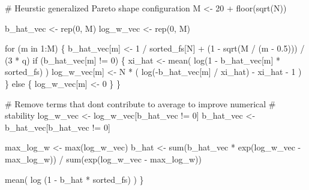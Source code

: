 \documentclass[
  letterpaper,
  DIV=11,
  numbers=noendperiod]{scrartcl}
\newenvironment{Shaded}{\begin{snugshade}}{\end{snugshade}}
\newcommand{\BuiltInTok}[1]{\textcolor[rgb]{0.00,0.23,0.31}{#1}}
\newcommand{\CommentTok}[1]{\textcolor[rgb]{0.37,0.37,0.37}{#1}}
\newcommand{\ControlFlowTok}[1]{\textcolor[rgb]{0.00,0.23,0.31}{#1}}
\newcommand{\DecValTok}[1]{\textcolor[rgb]{0.68,0.00,0.00}{#1}}
\newcommand{\FloatTok}[1]{\textcolor[rgb]{0.68,0.00,0.00}{#1}}
\newcommand{\KeywordTok}[1]{\textcolor[rgb]{0.00,0.23,0.31}{#1}}
\newcommand{\NormalTok}[1]{\textcolor[rgb]{0.00,0.23,0.31}{#1}}
\newcommand{\OperatorTok}[1]{\textcolor[rgb]{0.37,0.37,0.37}{#1}}
\begin{document}
\begin{Shaded}
\begin{Highlighting}[]
  \CommentTok{\# Heurstic generalized Pareto shape configuration}
\NormalTok{  M }\OperatorTok{\textless{}{-}} \DecValTok{20} \OperatorTok{+}\NormalTok{ floor(sqrt(N))}

\NormalTok{  b\_hat\_vec }\OperatorTok{\textless{}{-}}\NormalTok{ rep(}\DecValTok{0}\NormalTok{, M)}
\NormalTok{  log\_w\_vec }\OperatorTok{\textless{}{-}}\NormalTok{ rep(}\DecValTok{0}\NormalTok{, M)}

  \ControlFlowTok{for}\NormalTok{ (m }\KeywordTok{in} \DecValTok{1}\NormalTok{:M) \{}
\NormalTok{    b\_hat\_vec[m] }\OperatorTok{\textless{}{-}} \DecValTok{1} \OperatorTok{/}\NormalTok{ sorted\_fs[N] }\OperatorTok{+} 
\NormalTok{                 (}\DecValTok{1} \OperatorTok{{-}}\NormalTok{ sqrt(M }\OperatorTok{/}\NormalTok{ (m }\OperatorTok{{-}} \FloatTok{0.5}\NormalTok{))) }\OperatorTok{/}\NormalTok{ (}\DecValTok{3} \OperatorTok{*}\NormalTok{ q)}
    \ControlFlowTok{if}\NormalTok{ (b\_hat\_vec[m] }\OperatorTok{!=} \DecValTok{0}\NormalTok{) \{}
\NormalTok{      xi\_hat }\OperatorTok{\textless{}{-}}\NormalTok{ mean( log(}\DecValTok{1} \OperatorTok{{-}}\NormalTok{ b\_hat\_vec[m] }\OperatorTok{*}\NormalTok{ sorted\_fs) )}
\NormalTok{      log\_w\_vec[m] }\OperatorTok{\textless{}{-}}\NormalTok{ N }\OperatorTok{*}\NormalTok{ ( log(}\OperatorTok{{-}}\NormalTok{b\_hat\_vec[m] }\OperatorTok{/}\NormalTok{ xi\_hat) }\OperatorTok{{-}}\NormalTok{ xi\_hat }\OperatorTok{{-}} \DecValTok{1}\NormalTok{ )}
\NormalTok{    \} }\ControlFlowTok{else}\NormalTok{ \{}
\NormalTok{      log\_w\_vec[m] }\OperatorTok{\textless{}{-}} \DecValTok{0}
\NormalTok{    \}}
\NormalTok{  \}}
  
  \CommentTok{\# Remove terms that don\textquotesingle{}t contribute to average to improve numerical }
  \CommentTok{\# stability}
\NormalTok{  log\_w\_vec }\OperatorTok{\textless{}{-}}\NormalTok{ log\_w\_vec[b\_hat\_vec }\OperatorTok{!=} \DecValTok{0}\NormalTok{]}
\NormalTok{  b\_hat\_vec }\OperatorTok{\textless{}{-}}\NormalTok{ b\_hat\_vec[b\_hat\_vec }\OperatorTok{!=} \DecValTok{0}\NormalTok{]}

\NormalTok{  max\_log\_w }\OperatorTok{\textless{}{-}} \BuiltInTok{max}\NormalTok{(log\_w\_vec)}
\NormalTok{  b\_hat }\OperatorTok{\textless{}{-}} \BuiltInTok{sum}\NormalTok{(b\_hat\_vec }\OperatorTok{*}\NormalTok{ exp(log\_w\_vec }\OperatorTok{{-}}\NormalTok{ max\_log\_w)) }\OperatorTok{/}
           \BuiltInTok{sum}\NormalTok{(exp(log\_w\_vec }\OperatorTok{{-}}\NormalTok{ max\_log\_w))}

\NormalTok{  mean( log (}\DecValTok{1} \OperatorTok{{-}}\NormalTok{ b\_hat }\OperatorTok{*}\NormalTok{ sorted\_fs) )}
\NormalTok{\}}
\end{Highlighting}
\end{Shaded}
\end{document}

